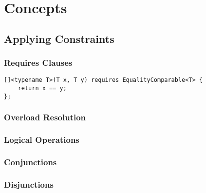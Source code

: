 \section{Concepts} \label{sec:concepts}

\subsection{Applying Constraints} \label{sec:applying_constraints}

    \subsubsection{Requires Clauses} \label{sec:requires_clauses}

        

        \begin{lstlisting}
[]<typename T>(T x, T y) requires EqualityComparable<T> {
    return x == y;
}; \end{lstlisting}

        

        

        

    \subsubsection{Overload Resolution} \label{sec:overload_resolution}

        

    \subsubsection{Logical Operations} \label{sec:logical_operations}

        \subsubsection*{Conjunctions} \label{sec:conjunctions}

        

        \subsubsection*{Disjunctions} \label{sec:disjunctions}


